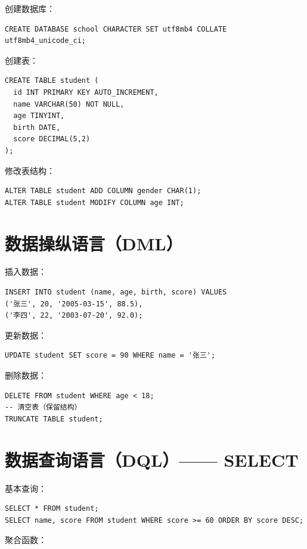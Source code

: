 \documentclass[12pt,UTF8]{ctexbook}
\begin{document}
创建数据库：

\begin{lstlisting}
CREATE DATABASE school CHARACTER SET utf8mb4 COLLATE utf8mb4_unicode_ci;
\end{lstlisting}

创建表：

\begin{lstlisting}
CREATE TABLE student (
  id INT PRIMARY KEY AUTO_INCREMENT,
  name VARCHAR(50) NOT NULL,
  age TINYINT,
  birth DATE,
  score DECIMAL(5,2)
);
\end{lstlisting}

修改表结构：

\begin{lstlisting}
ALTER TABLE student ADD COLUMN gender CHAR(1);
ALTER TABLE student MODIFY COLUMN age INT;
\end{lstlisting}

\section{数据操纵语言（DML）}

插入数据：

\begin{lstlisting}
INSERT INTO student (name, age, birth, score) VALUES
('张三', 20, '2005-03-15', 88.5),
('李四', 22, '2003-07-20', 92.0);
\end{lstlisting}

更新数据：

\begin{lstlisting}
UPDATE student SET score = 90 WHERE name = '张三';
\end{lstlisting}

删除数据：

\begin{lstlisting}
DELETE FROM student WHERE age < 18;
-- 清空表（保留结构）
TRUNCATE TABLE student;
\end{lstlisting}

\section{数据查询语言（DQL）—— SELECT}

基本查询：

\begin{lstlisting}
SELECT * FROM student;
SELECT name, score FROM student WHERE score >= 60 ORDER BY score DESC;
\end{lstlisting}

聚合函数：
\end{document}
